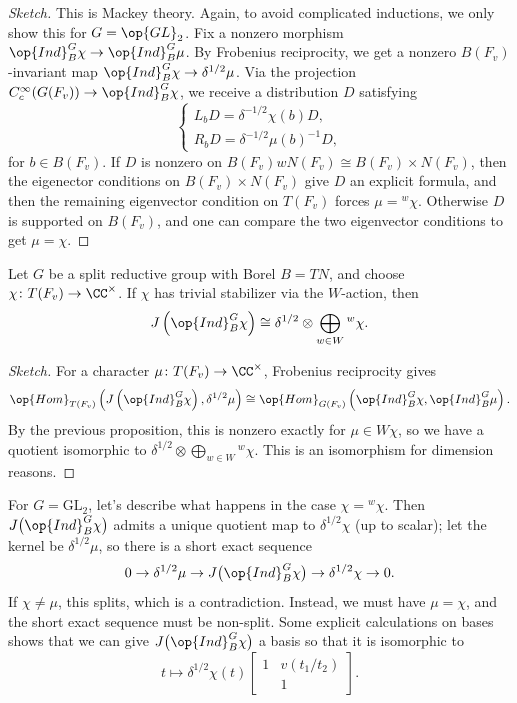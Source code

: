 \documentclass{article}
\begin{document}
\begin{proof}[Sketch]
	This is Mackey theory.  Again, to avoid complicated inductions, we only show this for $G=\op{GL}_2$. Fix a nonzero morphism $\op{Ind}_B^G\chi\to\op{Ind}_B^G\mu$. By Frobenius reciprocity, we get a nonzero $B(F_v)$-invariant map $\op{Ind}_B^G\chi\to\delta^{1/2}\mu$. Via the projection $C_c^\infty(G(F_v))\to\op{Ind}_B^G\chi$, we receive a distribution $D$ satisfying 
	\[\begin{cases}
		L_bD=\delta^{-1/2}\chi(b)D, \\
		R_bD=\delta^{-1/2}\mu(b)^{-1}D,
	\end{cases}\]
	for $b\in B(F_v)$. If $D$ is nonzero on $B(F_v)wN(F_v)\cong B(F_v)\times N(F_v)$, then the eigenector conditions on $B(F_v)\times N(F_v)$ give $D$ an explicit formula, and then the remaining eigenvector condition on $T(F_v)$ forces $\mu={^w\chi}$. Otherwise $D$ is supported on $B(F_v)$, and one can compare the two eigenvector conditions to get $\mu=\chi$.
\end{proof}
\begin{proposition}
	Let $G$ be a split reductive group with Borel $B=TN$, and choose $\chi\colon T(F_v)\to\CC^\times$. If $\chi$ has trivial stabilizer via the $W$-action, then
	\[J\left(\op{Ind}_B^G\chi\right)\cong\delta^{1/2}\otimes\bigoplus_{w\in W}{^w\chi}.\]
\end{proposition}
\begin{proof}[Sketch]
	For a character $\mu\colon T(F_v)\to\CC^\times$, Frobenius reciprocity gives
	\[\op{Hom}_{T(F_v)}\left(J\left(\op{Ind}_B^G\chi\right),\delta^{1/2}\mu\right)\cong\op{Hom}_{G(F_v)}\left(\op{Ind}_B^G\chi,\op{Ind}_B^G\mu\right).\]
	By the previous proposition, this is nonzero exactly for $\mu\in W\chi$, so we have a quotient isomorphic to $\delta^{1/2}\otimes\bigoplus_{w\in W}{^w\chi}$. This is an isomorphism for dimension reasons.
\end{proof}
\begin{example}
	For $G=\mathrm{GL}_2$, let's describe what happens in the case $\chi={^w\chi}$. Then $J\big(\op{Ind}_B^G\chi\big)$ admits a unique quotient map to $\delta^{1/2}\chi$ (up to scalar); let the kernel be $\delta^{1/2}\mu$, so there is a short exact sequence
	\[0\to\delta^{1/2}\mu\to J\big(\op{Ind}_B^G\chi\big)\to\delta^{1/2}\chi\to0.\]
	If $\chi\ne\mu$, this splits, which is a contradiction. Instead, we must have $\mu=\chi$, and the short exact sequence must be non-split. Some explicit calculations on bases shows that we can give $J\big(\op{Ind}_B^G\chi\big)$ a basis so that it is isomorphic to
	\[t\mapsto\delta^{1/2}\chi(t)\begin{bmatrix}
		1 & v(t_1/t_2) \\ & 1
	\end{bmatrix}.\]
\end{example}
\end{document}
